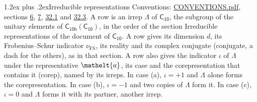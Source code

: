 \documentclass[10pt,a4paper]{article}
\makeatletter
\renewcommand\section{\@startsection{section}{1}{\z@}{-3ex plus -1ex minus -.2ex}%
  {1.2ex plus .2ex}{\normalfont\large\sffamily\bfseries\color{parttitle}}}
\numberwithin{equation}{section}
\newcommand{\eltfont}[1]{{\let\sigma\eltsigma\mathelt{#1}}}
\newcommand{\grp}[1]{\mathsf{#1}}
\newcommand{\elt}[1]{\eltfont{#1}}
\newcommand{\fsind}{\nu_{\mathrm{FS}}}
\makeatother
\begin{document}
\section{Irreducible representations}\label{s:irreps}
Conventions: \href{../../CONVENTIONS.pdf}{CONVENTIONS.pdf}, sections \href{../../../rotation/CONVENTIONS.pdf\#conv.6}{6}, \href{../../../rotation/CONVENTIONS.pdf\#conv.7}{7}, \href{../../CONVENTIONS.pdf\#conv.32.1}{32.1} and \href{../../CONVENTIONS.pdf\#conv.32.3}{32.3}.
\leavevmode\label{n:irrep.Delta}A row is an irrep $\Lambda$ of $\grp{C_{10}}$, the subgroup of the unitary elements of $\grp{C_{10h}}(\grp{C_{10}})$, in the order of the section Irreducible representations of the document of \href{../../../rotation/data/pdf/C10.pdf}{$\grp{C_{10}}$}. \label{n:index.dimension}\label{n:index.frobenius}\label{n:head.irrep}\label{n:head.reality}\label{n:head.conjugate}A row gives its dimension $d$, its Frobenius--Schur indicator $\fsind$, its reality and its complex conjugate (conjugate, a dash for the others), as in that section. \label{n:head.case.corep}\label{n:head.corep}A row also gives the indicator $\iota$ of $\Lambda$ under the representative $\elt{a}$, its case and the corepresentation that contains it (corep), named by its irreps. In case (a), $\iota = +1$ and $\Lambda$ alone forms the corepresentation. In case (b), $\iota = -1$ and two copies of $\Lambda$ form it. In case (c), $\iota = 0$ and $\Lambda$ forms it with its partner, another irrep.
\setlength{\emergencystretch}{2em}\par\setlength{\emergencystretch}{0pt}
\end{document}
